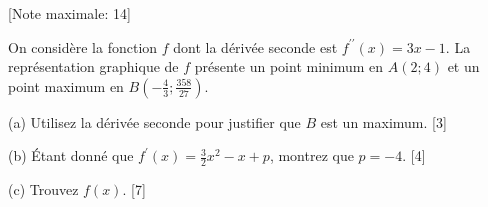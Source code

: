 \begin{question}
  \hspace*{\fill} [Note maximale: 14]\par
  \medskip
  \noindent On considère la fonction $f$ dont la dérivée seconde est $f^{\prime\prime}(x) = 3x -1$. La représentation graphique de $f$ présente un point minimum en $A(2 ; 4)$ et un point maximum en $B(-\frac{4}{3}; \frac{358}{27})$.\par
  \medskip
  (a) Utilisez la dérivée seconde pour justifier que $B$ est un maximum.\hspace*{\fill} [3]\par
  \medskip
  (b) Étant donné que $f^\prime(x) = \frac{3}{2}x^2 - x + p$, montrez que $p = -4$.\hspace*{\fill} [4]\par
  \medskip
  (c) Trouvez $f(x)$.\hspace*{\fill} [7]\par
\end{question}

